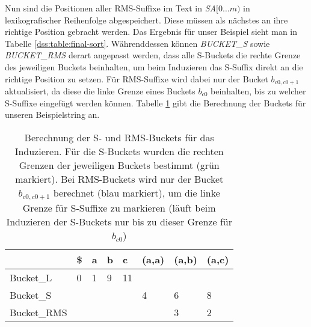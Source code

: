 Nun sind die Positionen aller RMS-Suffixe im Text in \textit{SA$[0\dots m)$} in lexikografischer Reihenfolge abgespeichert. Diese müssen als nächstes an ihre richtige Position gebracht werden. Das Ergebnis für unser Beispiel sieht man in Tabelle \ref{dss:table:final-sort}. Währenddessen können \textit{BUCK\-ET\_S} sowie \textit{BUCK\-ET\_RMS} derart angepasst werden, dass alle S-Buckets die rechte Grenze des jeweiligen Buckets beinhalten, um beim Induzieren das S-Suffix direkt an die richtige Position zu setzen. Für RMS-Suffixe wird dabei nur der Bucket $b_{c0,c0+1}$ aktualisiert, da diese die linke Grenze eines Buckets $b_{c0}$ beinhalten, bis zu welcher S-Suffixe eingefügt werden können. Tabelle \ref{dss:table:last-buckets} gibt die Berechnung der Buckets für unseren Beispielstring an.

\begin{table}
	\begin{tabular}{l|l|l|l|l|l|l|l|}
		\cline{2-8}
		& \$ & a & b & c  & (a,a)                     & (a,b)                     & (a,c)                     \\ \hline
		\multicolumn{1}{|l|}{Bucket\_L}   & 0  & 1 & 9 & 11 &                           &                           &                           \\ \hline
		\multicolumn{1}{|l|}{Bucket\_S}   &    &   &   &    & \cellcolor[HTML]{32CB00}4 & \cellcolor[HTML]{32CB00}6 & \cellcolor[HTML]{32CB00}8 \\ \hline
		\multicolumn{1}{|l|}{Bucket\_RMS} &    &   &   &    &                           & \cellcolor[HTML]{34CDF9}3 & 2                         \\ \hline
	\end{tabular}
	\caption{Berechnung der S- und RMS-Buckets für das Induzieren. Für die S-Buckets wurden die rechten Grenzen der jeweiligen Buckets bestimmt (grün markiert). Bei RMS-Buckets wird nur der Bucket $b_{c0, c0+1}$ berechnet (blau markiert), um die linke Grenze für S-Suffixe zu markieren (läuft beim Induzieren der S-Buckets nur bis zu dieser Grenze für $b_{c0}$)}
	\label{dss:table:last-buckets}
\end{table}
